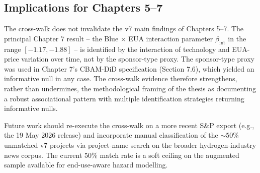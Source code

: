 \documentclass[11pt,a4paper]{article}
\newcommand{\bint}{\beta_{\mathrm{int}}}
\begin{document}
\subsection{Implications for Chapters 5--7}

The cross-walk does not invalidate the v7 main findings of Chapters 5--7. The principal Chapter 7 result -- the Blue $\times$ EUA interaction parameter $\bint$ in the range $[-1.17, -1.88]$ -- is identified by the interaction of technology and EUA-price variation over time, not by the sponsor-type proxy. The sponsor-type proxy was used in Chapter 7's CBAM-DiD specification (Section 7.6), which yielded an informative null in any case. The cross-walk evidence therefore strengthens, rather than undermines, the methodological framing of the thesis as documenting a robust associational pattern with multiple identification strategies returning informative nulls.

Future work should re-execute the cross-walk on a more recent S\&P export (e.g., the 19 May 2026 release) and incorporate manual classification of the $\sim 50\%$ unmatched v7 projects via project-name search on the broader hydrogen-industry news corpus. The current $50\%$ match rate is a soft ceiling on the augmented sample available for end-use-aware hazard modelling.
\end{document}
